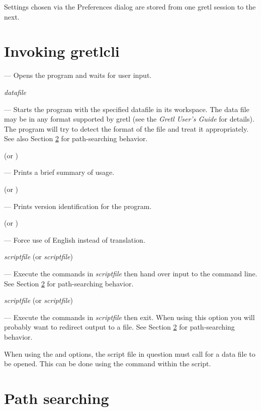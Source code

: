 Settings chosen via the Preferences dialog are stored from one gretl
session to the next.
      
\section{Invoking gretlcli}
\label{optarg2}


--- Opens the program and waits for user input.
      
 \textsl{datafile}

--- Starts the program with the specified datafile in its
workspace. The data file may be in any format supported by gretl
(see the \emph{Gretl User's Guide} for details). The program will try
to detect the format of the file and treat it appropriately. See also
Section \ref{path-search} for path-searching behavior.

 (or )

--- Prints a brief summary of usage.

 (or )

--- Prints version identification for the program.

 (or )

--- Force use of English instead of translation.

 \textsl{scriptfile} (or 
\textsl{scriptfile})

--- Execute the commands in \textsl{scriptfile} then hand over input
to the command line.  See Section \ref{path-search} for path-searching
behavior.

 \textsl{scriptfile} (or 
\textsl{scriptfile})

--- Execute the commands in \textsl{scriptfile} then exit.  When using
this option you will probably want to redirect output to a file. See
Section \ref{path-search} for path-searching behavior.

When using the  and  options, the script file
in question must call for a data file to be opened. This can be done
using the  command within the script.
      
\section{Path searching}
\label{path-search}


